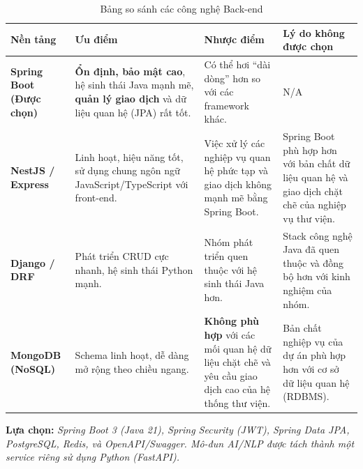 \begin{table}[h!]
\centering
\setlength{\tabcolsep}{6pt}
\begin{tabularx}{\linewidth}{|>{\bfseries}l|>{\raggedright\arraybackslash}X|%
>{\raggedright\arraybackslash}X|%
>{\raggedright\arraybackslash}X|}
 \hline
 \textbf{Nền tảng}
& \textbf{Ưu điểm}
& \textbf{Nhược điểm}
& \textbf{Lý do không được chọn} \\
 \hline
 \textbf{Spring Boot (Được chọn)}
& \textbf{Ổn định, bảo mật cao}, hệ sinh thái Java mạnh mẽ, \textbf{quản lý giao dịch} và dữ liệu quan hệ (JPA) rất tốt.
& Có thể hơi “dài dòng” hơn so với các framework khác.
& N/A \\
 \hline
 NestJS / Express
& Linh hoạt, hiệu năng tốt, sử dụng chung ngôn ngữ JavaScript/TypeScript với front-end.
& Việc xử lý các nghiệp vụ quan hệ phức tạp và giao dịch không mạnh mẽ bằng Spring Boot.
& Spring Boot phù hợp hơn với bản chất dữ liệu quan hệ và giao dịch chặt chẽ của nghiệp vụ thư viện. \\
 \hline
 Django / DRF
& Phát triển CRUD cực nhanh, hệ sinh thái Python mạnh.
& Nhóm phát triển quen thuộc với hệ sinh thái Java hơn.
& Stack công nghệ Java đã quen thuộc và đồng bộ hơn với kinh nghiệm của nhóm. \\
 \hline
 MongoDB (NoSQL)
& Schema linh hoạt, dễ dàng mở rộng theo chiều ngang.
& \textbf{Không phù hợp} với các mối quan hệ dữ liệu chặt chẽ và yêu cầu giao dịch cao của hệ thống thư viện.
& Bản chất nghiệp vụ của dự án phù hợp hơn với cơ sở dữ liệu quan hệ (RDBMS). \\
 \hline
\end{tabularx}
\caption{Bảng so sánh các công nghệ Back-end}
\label{tab:backend-compare}
\end{table}

\textbf{Lựa chọn:} \emph{Spring Boot 3 (Java 21), Spring Security (JWT), Spring Data JPA, PostgreSQL, Redis, và OpenAPI/Swagger. Mô-đun AI/NLP được tách thành một service riêng sử dụng Python (FastAPI).}

